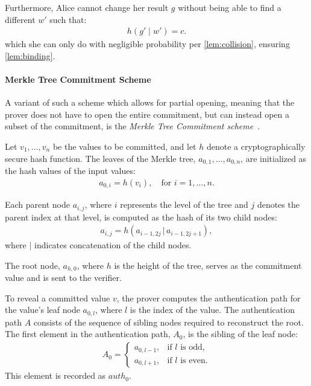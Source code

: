 \documentclass[11pt]{report}
\theoremstyle{definition}
\theoremstyle{plain}
\begin{document}
Furthermore, Alice cannot change her result $g$ without being able to find a different $w'$ such that:
\begin{align*}
  h(g' \mid w') = c.
\end{align*}
which she can only do with negligible probability per \autoref{lem:collision}, ensuring \autoref{lem:binding}.

\paragraph{Merkle Tree Commitment Scheme}\label{sub:merkle_tree_prelim}
A variant of such a scheme which allows for partial opening, meaning that the prover does not have to open the entire commitment, but can instead open a subset of the commitment, is the \textit{Merkle Tree Commitment scheme}~\cite{becker2008merkle}.

Let $v_1, \dots, v_n$ be the values to be committed, and let $h$ denote a cryptographically secure hash function. The leaves of the Merkle tree, $a_{0,1}, \dots, a_{0,n}$, are initialized as the hash values of the input values:
\begin{align*}
  a_{0,i} = h(v_i), \quad \text{for } i = 1, \dots, n.
\end{align*}

Each parent node $a_{i,j}$, where $i$ represents the level of the tree and $j$ denotes the parent index at that level, is computed as the hash of its two child nodes:
\begin{align*}
  a_{i,j} = h(a_{i-1,2j} \, | \, a_{i-1,2j+1}),
\end{align*}
where $|$ indicates concatenation of the child nodes.

The root node, $a_{h,0}$, where $h$ is the height of the tree, serves as the commitment value and is sent to the verifier.

To reveal a committed value $v$, the prover computes the authentication path for the value's leaf node $a_{0,l}$, where $l$ is the index of the value. The authentication path $A$ consists of the sequence of sibling nodes required to reconstruct the root. The first element in the authentication path, $A_0$, is the sibling of the leaf node:
\begin{align*}
  A_0 =
  \begin{cases}
    a_{0,l-1}, & \text{if } l \text{ is odd,}  \\
    a_{0,l+1}, & \text{if } l \text{ is even.}
  \end{cases}
\end{align*}
This element is recorded as $auth_0$.
\end{document}
